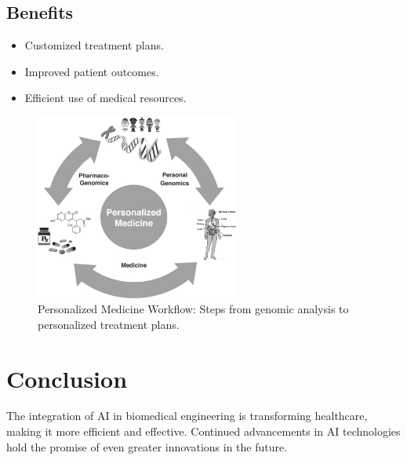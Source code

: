 \documentclass[12pt, a4paper]{article}
\begin{document}
\subsection{Benefits}
\begin{itemize}
    \item Customized treatment plans.
    \item Improved patient outcomes.
    \item Efficient use of medical resources.
\end{itemize}

\begin{figure}[h]
    \centering
    \includegraphics[width=0.6\textwidth]{Personalized-medicine-Personal-genomics.png}
    \caption{Personalized Medicine Workflow: Steps from genomic analysis to personalized treatment plans.}
    \label{fig:personalized_medicine_workflow}
\end{figure}
\newpage
\section{Conclusion}
The integration of AI in biomedical engineering is transforming healthcare, making it more efficient and effective. Continued advancements in AI technologies hold the promise of even greater innovations in the future.
\end{document}
